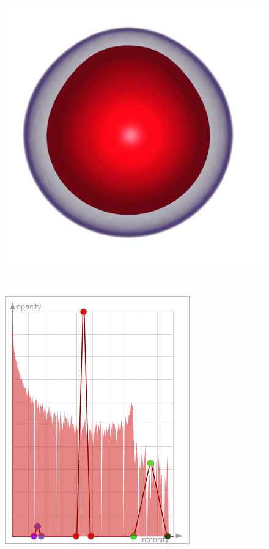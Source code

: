 \begin{figure}
	\centering
	\begin{minipage}{.35\textwidth}
		\includegraphics[width=1\linewidth]{images/nucleon_strong_red}
	\end{minipage}~
	\begin{minipage}{.2\textwidth}
		\includegraphics[width=1\linewidth]{images/tf_nucleon_strong_red}	

\end{minipage}
\end{figure}

